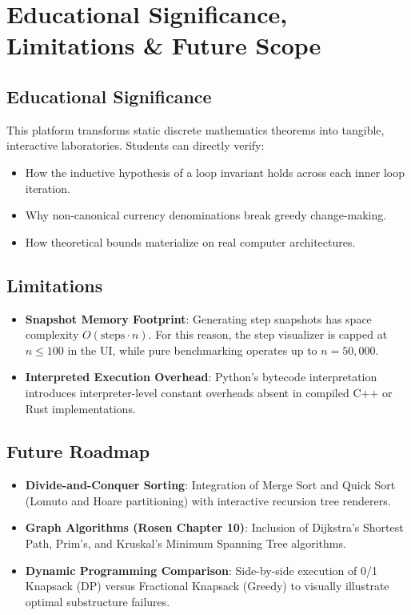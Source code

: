 \documentclass[11pt,a4paper]{article}
\theoremstyle{definition}
\theoremstyle{plain}
\theoremstyle{remark}
\begin{document}
\section{Educational Significance, Limitations \& Future Scope}

\subsection{Educational Significance}
This platform transforms static discrete mathematics theorems into tangible, interactive laboratories. Students can directly verify:
\begin{itemize}
    \item How the inductive hypothesis of a loop invariant holds across each inner loop iteration.
    \item Why non-canonical currency denominations break greedy change-making.
    \item How theoretical bounds materialize on real computer architectures.
\end{itemize}

\subsection{Limitations}
\begin{itemize}
    \item \textbf{Snapshot Memory Footprint}: Generating step snapshots has space complexity $O(\text{steps} \cdot n)$. For this reason, the step visualizer is capped at $n \le 100$ in the UI, while pure benchmarking operates up to $n = 50{,}000$.
    \item \textbf{Interpreted Execution Overhead}: Python's bytecode interpretation introduces interpreter-level constant overheads absent in compiled C++ or Rust implementations.
\end{itemize}

\subsection{Future Roadmap}
\begin{itemize}
    \item \textbf{Divide-and-Conquer Sorting}: Integration of Merge Sort and Quick Sort (Lomuto and Hoare partitioning) with interactive recursion tree renderers.
    \item \textbf{Graph Algorithms (Rosen Chapter 10)}: Inclusion of Dijkstra's Shortest Path, Prim's, and Kruskal's Minimum Spanning Tree algorithms.
    \item \textbf{Dynamic Programming Comparison}: Side-by-side execution of 0/1 Knapsack (DP) versus Fractional Knapsack (Greedy) to visually illustrate optimal substructure failures.
\end{itemize}
\end{document}
